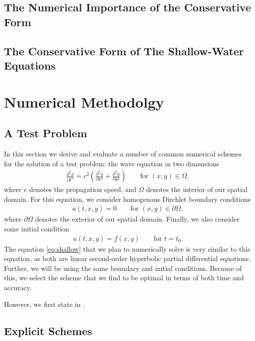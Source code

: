 \documentclass[12pt,a4]{article}
\begin{document}
\subsection{The Numerical Importance of the Conservative Form}


\subsection{The Conservative Form of The Shallow-Water Equations}


\section{Numerical Methodolgy}
\subsection{A Test Problem}
In this section we derive and evaluate a number of common numerical schemes for the solution of a test problem: the wave equation in two dimensions
\begin{gather}\label{eq:wave}
    \frac{\partial^2 u}{\partial t^2} = c^2\left(\frac{\partial^2 u}{\partial x^2} + \frac{\partial^2 u}{\partial y^2} \right)\qquad\text{for }(x,y)\in\Omega,
\end{gather}
where $c$ denotes the propagation speed, and $\Omega$ denotes the interior of our spatial domain. For this equation, we consider homogenous Dirchlet boundary conditions
\begin{gather}\label{eq:bcs}
    u(t,x,y) = 0\qquad\text{for }(x,y)\in\partial\Omega,
\end{gather}
where $\partial\Omega$ denotes the exterior of our spatial domain. Finally, we also consider some initial condition
\begin{gather}\label{eq:ic}
    u(t,x,y) = f(x,y)\qquad\text{for }t=t_0.
\end{gather}
The equation \ref{eq:shallow}  that we plan to numerically solve is very similar to this equation, as both are linear second-order hyperbolic partial differential equations. Further, we will be using the same boundary and initial conditions. Because of this, we select the scheme that we find to be optimal in terms of both time and accuracy.

\noindent However, we first state \label{eq:wave} in .

\subsection{Explicit Schemes}
\end{document}

